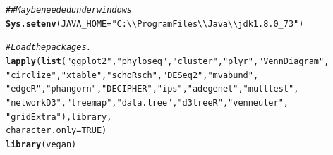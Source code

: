 \documentclass[12pt]{article}\usepackage[]{graphicx}\usepackage[]{color}
\makeatletter
\newcommand{\hlnum}[1]{\textcolor[rgb]{0.686,0.059,0.569}{#1}}%
\newcommand{\hlstr}[1]{\textcolor[rgb]{0.192,0.494,0.8}{#1}}%
\newcommand{\hlcom}[1]{\textcolor[rgb]{0.678,0.584,0.686}{\textit{#1}}}%
\newcommand{\hlstd}[1]{\textcolor[rgb]{0.345,0.345,0.345}{#1}}%
\newcommand{\hlkwc}[1]{\textcolor[rgb]{0.333,0.667,0.333}{#1}}%
\newcommand{\hlkwd}[1]{\textcolor[rgb]{0.737,0.353,0.396}{\textbf{#1}}}%
\newenvironment{kframe}{%
 \def\at@end@of@kframe{}%
 \ifinner\ifhmode%
  \def\at@end@of@kframe{\end{minipage}}%
  \begin{minipage}{\columnwidth}%
 \fi\fi%
 \def\FrameCommand##1{\hskip\@totalleftmargin \hskip-\fboxsep
 \colorbox{shadecolor}{##1}\hskip-\fboxsep
     \hskip-\linewidth \hskip-\@totalleftmargin \hskip\columnwidth}%
 \MakeFramed {\advance\hsize-\width
   \@totalleftmargin\z@ \linewidth\hsize
   \@setminipage}}%
 {\par\unskip\endMakeFramed%
 \at@end@of@kframe}
\newenvironment{knitrout}{}{} %
\numberwithin{figure}{section}
\makeatother
\begin{document}
\begin{knitrout}\small
{}\color{fgcolor}\begin{kframe}
\begin{alltt}
\hlcom{## May be needed under windows}
\hlkwd{Sys.setenv}\hlstd{(}\hlkwc{JAVA_HOME} \hlstd{=} \hlstr{"C:\textbackslash{}\textbackslash{}Program Files\textbackslash{}\textbackslash{}Java\textbackslash{}\textbackslash{}jdk1.8.0_73"}\hlstd{)}

\hlcom{#Load the packages.}
\hlkwd{lapply}\hlstd{(}\hlkwd{list}\hlstd{(}\hlstr{"ggplot2"}\hlstd{,} \hlstr{"phyloseq"}\hlstd{,} \hlstr{"cluster"}\hlstd{,} \hlstr{"plyr"}\hlstd{,} \hlstr{"VennDiagram"}\hlstd{,}
            \hlstr{"circlize"}\hlstd{,} \hlstr{"xtable"}\hlstd{,} \hlstr{"schoRsch"}\hlstd{,} \hlstr{"DESeq2"}\hlstd{,} \hlstr{"mvabund"}\hlstd{,}
            \hlstr{"edgeR"}\hlstd{,} \hlstr{"phangorn"}\hlstd{,} \hlstr{"DECIPHER"}\hlstd{,} \hlstr{"ips"}\hlstd{,} \hlstr{"adegenet"}\hlstd{,} \hlstr{"multtest"}\hlstd{,}
            \hlstr{"networkD3"}\hlstd{,} \hlstr{"treemap"}\hlstd{,} \hlstr{"data.tree"}\hlstd{,} \hlstr{"d3treeR"}\hlstd{,} \hlstr{"venneuler"}\hlstd{,}
            \hlstr{"gridExtra"}\hlstd{), library,}
       \hlkwc{character.only} \hlstd{=} \hlnum{TRUE}\hlstd{)}
\hlkwd{library}\hlstd{(vegan)}
\end{alltt}
\end{kframe}
\end{knitrout}
\end{document}
